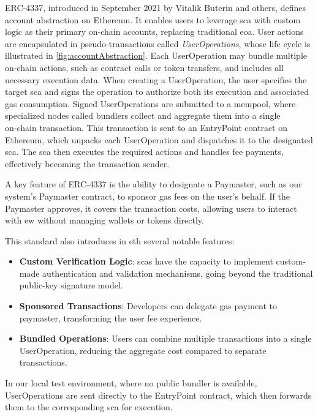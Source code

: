 ERC‑4337, introduced in September 2021 by Vitalik Buterin and others\cite{buterin2021erc}, defines account abstraction on Ethereum. It enables users to leverage \acrlong{sca} with custom logic as their primary on‑chain accounts, replacing traditional \acrshort{eoa}. User actions are encapsulated in pseudo‑transactions called \textit{UserOperations}, whose life cycle is illustrated in \cref{fig:accountAbstraction}. Each UserOperation may bundle multiple on‑chain actions, such as contract calls or token transfers, and includes all necessary execution data. When creating a UserOperation, the user specifies the target \acrshort{sca} and signs the operation to authorize both its execution and associated gas consumption.
Signed UserOperations are submitted to a \gls{mempool}, where specialized nodes called bundlers collect and aggregate them into a single on‑chain transaction. This transaction is sent to an EntryPoint contract on Ethereum, which unpacks each UserOperation and dispatches it to the designated \acrshort{sca}. The \acrshort{sca} then executes the required actions and handles fee payments, effectively becoming the transaction sender.

A key feature of ERC‑4337 is the ability to designate a Paymaster, such as our system’s Paymaster contract, to sponsor gas fees on the user’s behalf. If the Paymaster approves, it covers the transaction costs, allowing users to interact with \acrlong{ew} without managing wallets or tokens directly.

This standard also introduces in \acrlong{eth} several notable features:
\begin{itemize}
    \item \textbf{Custom Verification Logic}: \acrlong{sca}s have the capacity to implement custom-made authentication and validation mechanisms, going beyond the traditional public-key signature model.
    \item \textbf{Sponsored Transactions}: Developers can delegate gas payment to paymaster, transforming the user fee experience.
    \item \textbf{Bundled Operations}: Users can combine multiple transactions into a single UserOperation, reducing the aggregate cost compared to separate transactions.
\end{itemize}

In our local test environment, where no public bundler is available, UserOperations are sent directly to the EntryPoint contract, which then forwards them to the corresponding \acrshort{sca} for execution.

